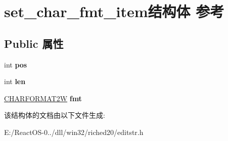 \hypertarget{structset__char__fmt__item}{}\section{set\+\_\+char\+\_\+fmt\+\_\+item结构体 参考}
\label{structset__char__fmt__item}
\subsection*{Public 属性}
\begin{DoxyCompactItemize}
\item 
\mbox{\label{structset__char__fmt__item_afa78afe700c81fc9f1011f2f117a7101}} 
int {\bfseries pos}
\item 
\mbox{\label{structset__char__fmt__item_a24210369d0f0fce62f84c8e61ad4cfd7}} 
int {\bfseries len}
\item 
\mbox{\label{structset__char__fmt__item_af66686a6e80a96424b2820e2ca9cc130}} 
\hyperlink{struct__charformat2w}{C\+H\+A\+R\+F\+O\+R\+M\+A\+T2W} {\bfseries fmt}
\end{DoxyCompactItemize}


该结构体的文档由以下文件生成\+:\begin{DoxyCompactItemize}
\item 
E\+:/\+React\+O\+S-\/0../dll/win32/riched20/editstr.\+h\end{DoxyCompactItemize}
